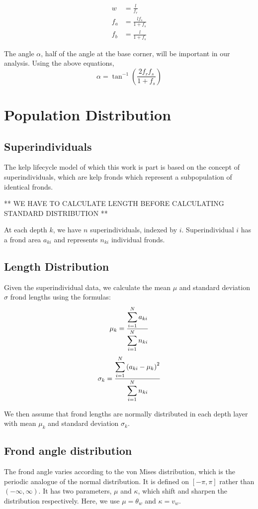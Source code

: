 \begin{align}
	w &= \frac{l}{f_r} \\
	f_a &= \frac{lf_s}{1+f_s} \\
	f_b &= \frac{l}{1+f_s}
\end{align}

The angle $\alpha$, half of the angle at the base corner, will be important in our analysis.
Using the above equations,
\begin{equation}
	\alpha = \tan^{-1}\left(\frac{2f_rf_s}{1+f_s}\right)
\end{equation}

\section{Population Distribution}
\label{sec:dist}

\subsection{Superindividuals}

The kelp lifecycle model of which this work is part is based on the concept of
superindividuals, which are kelp fronds which represent a subpopulation of
identical fronds.

** WE HAVE TO CALCULATE LENGTH BEFORE CALCULATING STANDARD DISTRIBUTION **

At each depth $k$, we have $n$ superindividuals, indexed by $i$. Superindividual
$i$ has a frond area $a_{ki}$ and represents $n_{ki}$ individual fronds.

\subsection{Length Distribution}

Given the superindividual data, we calculate the mean $\mu$ and standard deviation $\sigma$ frond
lengths using the formulas:
\begin{equation}
  \mu_k = \frac{\displaystyle \sum_{i=1}^N a_{ki}}{\displaystyle \sum_{i=1}^N n_{ki}} 
\end{equation}
\begin{equation}
  \sigma_k = \frac{\displaystyle \sum_{i=1}^N \left( a_{ki} - \mu_k \right)^2}{\displaystyle \sum_{i=1}^N n_{ki}} 
\end{equation}

We then assume that frond lengths are normally distributed in each depth layer
with mean $\mu_k$ and standard deviation $\sigma_k$.

\subsection{Frond angle distribution}
\label{sec:angle_dist}
The frond angle varies according to the von Mises distribution, which is the periodic analogue of the normal distribution.
It is defined on $[-\pi,\pi]$ rather than $(-\infty,\infty)$.
It has two parameters, $\mu$ and $\kappa$, which shift and sharpen the distribution respectively.
Here, we use $\mu = \theta_w$ and $\kappa = v_w$.

